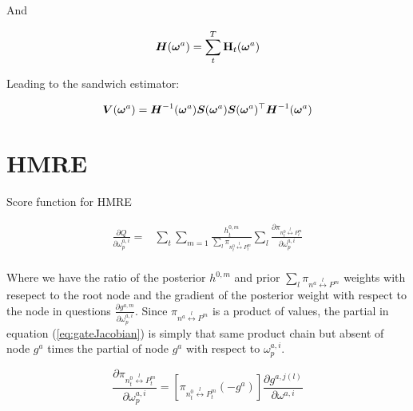 \documentclass[12pt]{article}
\begin{document}
And

\begin{equation}
  \boldsymbol{H}(\boldsymbol{\omega}^{a}) = \sum_{t}^{T} \mathbf{H}_{t}(\boldsymbol{\omega}^{a})
\end{equation}

Leading to the sandwich estimator:

\begin{equation} \label{eq:robustgatevarcov}
  \boldsymbol{V}(\boldsymbol{\omega}^{a}) = \boldsymbol{H}^{-1}(\boldsymbol{\omega}^{a}) \boldsymbol{S}(\boldsymbol{\omega}^{a}) \boldsymbol{S}(\boldsymbol{\omega}^{a})^\top \boldsymbol{H}^{-1}(\boldsymbol{\omega}^{a})
\end{equation}
\section{HMRE}


Score function for HMRE

\begin{equation} \label{eq:gateJacobian}
  \begin{split}
    \frac{\partial Q}{\partial \omega^{a,i}_{p}} =& \sum_{t} \sum_{m=1}  \frac{h^{0,m}_{t}}{\sum_{l} \pi_{n^{0}_{t} \overset{l}{\longleftrightarrow} P^{m}_{t}}} \sum_{l} \frac{\partial \pi_{n^{0}_{t} \overset{l}{\longleftrightarrow} P^{m}_{t}}}{\partial \omega^{a,i}_{p}} \\
  \end{split}
\end{equation}

Where we have the ratio of the posterior $h^{0,m}$ and prior 
$\sum_{l} \pi_{n^{a} \overset{l}{\longleftrightarrow} P^{m}}$ weights with resepect
to the root node and the gradient of the posterior weight with respect to the node
in questions $\frac{\partial g^{a,m}}{\partial \omega^{a,i}_{p}}$. Since
$\pi_{n^{a} \overset{l}{\longleftrightarrow} P^{m}}$ is a product of values, the
partial in equation (\ref{eq:gateJacobian}) is simply that same product chain but
absent of node $g^a$ times the partial of node $g^a$ with respect to
$\omega^{a,i}_{p}$.

\begin{equation} \label{eq:gatechainpartial}
  \frac{\partial \pi_{n^{0}_{t} \overset{l}{\longleftrightarrow} P^{m}_{t}}}{\partial \omega^{a,i}_{p}} = [\pi_{n^{0}_{t} \overset{l}{\longleftrightarrow} P^{m}_{t}} (-g^{a})] \frac{\partial g^{a, j(l)}}{\partial \omega^{a, i}}
\end{equation}
\end{document}
